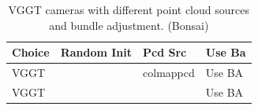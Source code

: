 \begin{table}[H]
\caption{VGGT cameras with different point cloud sources and bundle adjustment. (Bonsai)}
\label{tab:06_isolated_cams_vggt_ba_bonsai}
\begin{tabular}{lrll}
\toprule
Choice & Random Init & Pcd Src & Use Ba \\
\midrule
VGGT &  & colmappcd & Use BA \\
VGGT &  &  & Use BA \\
\bottomrule
\end{tabular}
\end{table}
